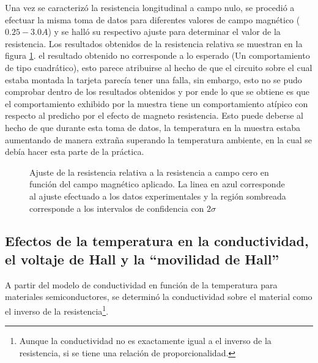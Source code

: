 \documentclass[%
 reprint,
 amsmath,amssymb,
 aps,
]{revtex4-1}
\begin{document}
Una vez se caracterizó la resistencia longitudinal a campo nulo, se procedió a efectuar la misma toma de datos para diferentes valores de campo magnético ($0.25 - 3.0 A$) y se halló su respectivo ajuste para determinar el valor de la resistencia. Los resultados obtenidos de la resistencia relativa se muestran en la figura \ref{R_vs_Campo}. el resultado obtenido no corresponde a lo esperado (Un comportamiento de tipo cuadrático), esto parece atribuirse al hecho de que el circuito sobre el cual estaba montada la tarjeta parecía tener una falla, sin embargo, esto no se pudo comprobar dentro de los resultados obtenidos y por ende lo que se obtiene es que el comportamiento exhibido por la muestra tiene un comportamiento atípico con respecto al predicho por el efecto de magneto resistencia. Esto puede deberse al hecho de que durante esta toma de datos, la temperatura en la muestra estaba aumentando de manera extraña superando la temperatura ambiente, en la cual se debía hacer esta parte de la práctica.

\begin{figure}[h]
\caption{\label{R_vs_Campo}Ajuste de la resistencia relativa a la resistencia a campo cero en función del campo magnético aplicado.  La linea en azul corresponde al ajuste efectuado a los datos experimentales y la región sombreada corresponde a los intervalos de confidencia con $2\sigma$}
\end{figure}

\subsection{Efectos de la temperatura en la conductividad, el voltaje de Hall y la ``movilidad de Hall''}
A partir del modelo de conductividad en función de la temperatura para materiales semiconductores, se determinó la conductividad sobre el material como el inverso de la resistencia\footnote{Aunque la conductividad no es exactamente igual a el inverso de la resistencia, si se tiene una relación de proporcionalidad.}.
\end{document}
